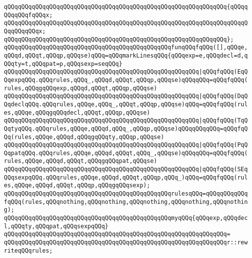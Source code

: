\verb|qQQqqQQqqQQqqQQqqQQqqQQqqQQqqQQqqQQqqQQqqQQqqQQqqQQqqQQqqQQqqQQq{qQQqqQQqqQQqfqQQqx;|\newline
\verb|qQQqqQQqqQQqqQQqqQQqqQQqqQQqqQQqqQQqqQQqqQQqqQQqqQQqqQQqqQQqqQQqqQQqqQQqqQQqqQQqx;|\newline
\verb|qQQqqQQqqQQqqQQqqQQqqQQqqQQqqQQqqQQqqQQqqQQqqQQqqQQqqQQqqQQqqQQq};|\newline
\newline
\verb|qQQqqQQqqQQqqQQqqQQqqQQqqQQqqQQqqQQqqQQqqQQqqQQqfunqQQqfqQQq([],qQQqe,qQQqd,qQQqt,qQQqp,qQQqse)qQQq=qQQqmarkLinesqQQq{qQQqexp=e,qQQqdecl=d,qQQqty=t,qQQqpat=p,qQQqsexp=seqQQq}|\newline
\verb|qQQqqQQqqQQqqQQqqQQqqQQqqQQqqQQqqQQqqQQqqQQqqQQqqQQqqQQq|\verb#|qQQqfqQQq(EqQQqexpqQQq.qQQqrules,qQQq_,qQQqd,qQQqt,qQQqp,qQQqse)qQQqqQQq=qQQqfqQQq(rules,qQQqgqQQqexp,qQQqd,qQQqt,qQQqp,qQQqse)#\newline
\verb|qQQqqQQqqQQqqQQqqQQqqQQqqQQqqQQqqQQqqQQqqQQqqQQqqQQqqQQq|\verb#|qQQqfqQQq(DqQQqdeclqQQq.qQQqrules,qQQqe,qQQq_,qQQqt,qQQqp,qQQqse)qQQq=qQQqfqQQq(rules,qQQqe,qQQqgqQQqdecl,qQQqt,qQQqp,qQQqse)#\newline
\verb|qQQqqQQqqQQqqQQqqQQqqQQqqQQqqQQqqQQqqQQqqQQqqQQqqQQqqQQq|\verb#|qQQqfqQQq(TqQQqtyqQQq.qQQqrules,qQQqe,qQQqd,qQQq_,qQQqp,qQQqse)qQQqqQQqqQQq=qQQqfqQQq(rules,qQQqe,qQQqd,qQQqgqQQqty,qQQqp,qQQqse)#\newline
\verb|qQQqqQQqqQQqqQQqqQQqqQQqqQQqqQQqqQQqqQQqqQQqqQQqqQQqqQQq|\verb#|qQQqfqQQq(PqQQqpatqQQq.qQQqrules,qQQqe,qQQqd,qQQqt,qQQq_,qQQqse)qQQqqQQq=qQQqfqQQq(rules,qQQqe,qQQqd,qQQqt,qQQqgqQQqpat,qQQqse)#\newline
\verb|qQQqqQQqqQQqqQQqqQQqqQQqqQQqqQQqqQQqqQQqqQQqqQQqqQQqqQQq|\verb#|qQQqfqQQq(SEqQQqsexpqQQq.qQQqrules,qQQqe,qQQqd,qQQqt,qQQqp,qQQq_)qQQq=qQQqfqQQq(rules,qQQqe,qQQqd,qQQqt,qQQqp,qQQqgqQQqsexp);#\newline
\newline
\verb|qQQqqQQqqQQqqQQqqQQqqQQqqQQqqQQqqQQqqQQqqQQqqQQqrulesqQQq=qQQqqQQqqQQqfqQQq(rules,qQQqnothing,qQQqnothing,qQQqnothing,qQQqnothing,qQQqnothing);|\newline
\newline
\verb|qQQqqQQqqQQqqQQqqQQqqQQqqQQqqQQqqQQqqQQqqQQqqQQqmyqQQq{qQQqexp,qQQqdecl,qQQqty,qQQqpat,qQQqsexpqQQq}|\newline
\verb|qQQqqQQqqQQqqQQqqQQqqQQqqQQqqQQqqQQqqQQqqQQqqQQqqQQqqQQqqQQqqQQq=|\newline
\verb|qQQqqQQqqQQqqQQqqQQqqQQqqQQqqQQqqQQqqQQqqQQqqQQqqQQqqQQqqQQqqQQqr::rewriteqQQqrules;|\newline
